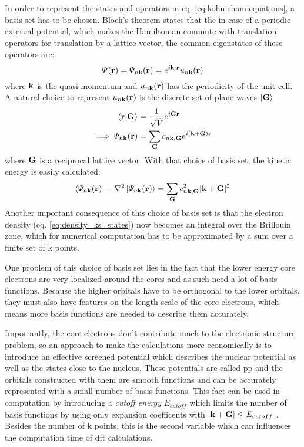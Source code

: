 \documentclass[main.tex]{subfiles}
\begin{document}
In order to represent the states and operators in eq. \ref{eq:kohn-sham-equations}, a basis set has to be chosen.
Bloch's theorem states that the in case of a periodic external potential, which makes the Hamiltonian commute with translation operators for translation by a lattice vector, the common eigenstates of these operators are:
\begin{equation}
    \Psi (\vb{r}) = \Psi_{n \vb{k}} (\vb{r}) = e^{i \vb{k} \cdot \vb{r}} u_{n \vb{k}} (\vb{r})
\end{equation}
where \(\vb{k}\) is the quasi-momentum and \(u_{n \vb{k}} (\vb{r})\) has the periodicity of the unit cell.
A natural choice to represent \(u_{n \vb{k}} (\vb{r})\) is the discrete set of plane waves \(\ket{\vb{G}}\)
\begin{align}
    \bra{\vb{r}} \ket{\vb{G}} &= \frac{1}{\sqrt{V}} e^{i \vb{G} \vb{r}} \\
    \implies \Psi_{n \vb{k}} (\vb{r}) &= \sum_{\vb{G}} c_{n \vb{k}, \vb{G}} e^{i (\vb{k} + \vb{G}) \vb{r}}
\end{align}
where \(\vb{G}\) is a reciprocal lattice vector. 
With that choice of basis set, the kinetic energy is easily calculated:
\begin{equation}
    \bra{\Psi_{n \vb{k}} (\vb{r})} - \nabla^2 \ket{\Psi_{n \vb{k}} (\vb{r})} = \sum_{\vb{G}} c_{n \vb{k}, \vb{G}}^2 \vert \vb{k} + \vb{G} \vert^2
\end{equation}
Another important consequence of this choice of basis set is that the electron density (eq. \ref{eq:density_ks_states}) now becomes an integral over the Brillouin zone, which for numerical computation has to be approximated by a sum over a finite set of k points. 

One problem of this choice of basis set lies in the fact that the lower energy core electrons are very localized around the cores and as such need a lot of basis functions.
Because the higher orbitals have to be orthogonal to the lower orbitals, they must also have features on the length scale of the core electrons, which means more basis functions are needed to describe them accurately.

Importantly, the core electrons don't contribute much to the electronic structure problem, so an approach to make the calculations more economically is to introduce an effective screened potential which describes the nuclear potential as well as the states close to the nucleus.
These potentials are called \acrfull{pp} and the orbitals constructed with them are smooth functions and can be accurately represented with a small number of basis functions.
This fact can be used in computation by introducing a \emph{cutoff energy} \(E_{cutoff}\) which limits the number of basis functions by using only expansion coefficents with \(\vert \vb{k} + \vb{G} \vert \leq E_{cutoff}\) . Besides the number of k points, this is the second variable which can influences the computation time of \acrshort{dft} calculations.
\end{document}
